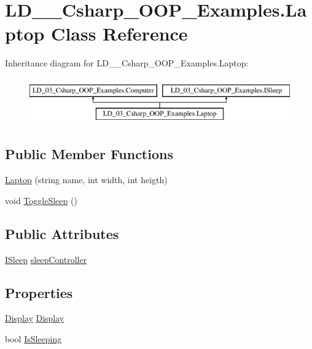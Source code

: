 \hypertarget{class_l_d__03___csharp___o_o_p___examples_1_1_laptop}{}\section{L\+D\+\_\+\_\+\+Csharp\+\_\+\+O\+O\+P\+\_\+\+Examples.\+Laptop Class Reference}
\label{class_l_d__03___csharp___o_o_p___examples_1_1_laptop}
Inheritance diagram for L\+D\+\_\+\_\+\+Csharp\+\_\+\+O\+O\+P\+\_\+\+Examples.\+Laptop\+:\begin{figure}[H]
\begin{center}
\leavevmode
\includegraphics[height=2.000000cm]{class_l_d__03___csharp___o_o_p___examples_1_1_laptop}
\end{center}
\end{figure}
\subsection*{Public Member Functions}
\begin{DoxyCompactItemize}
\item 
\mbox{\hyperlink{class_l_d__03___csharp___o_o_p___examples_1_1_laptop_a8221274b4d3b4d05eff718d010e0eefa}{Laptop}} (string name, int width, int heigth)
\item 
void \mbox{\hyperlink{class_l_d__03___csharp___o_o_p___examples_1_1_laptop_a28f09dd23331929b11cdc77720153e21}{Toggle\+Sleep}} ()
\end{DoxyCompactItemize}
\subsection*{Public Attributes}
\begin{DoxyCompactItemize}
\item 
\mbox{\hyperlink{interface_l_d__03___csharp___o_o_p___examples_1_1_i_sleep}{I\+Sleep}} \mbox{\hyperlink{class_l_d__03___csharp___o_o_p___examples_1_1_laptop_aabaead761ad3ae86e24f66e24d26fe31}{sleep\+Controller}}
\end{DoxyCompactItemize}
\subsection*{Properties}
\begin{DoxyCompactItemize}
\item 
\mbox{\hyperlink{class_l_d__03___csharp___o_o_p___examples_1_1_display}{Display}} \mbox{\hyperlink{class_l_d__03___csharp___o_o_p___examples_1_1_laptop_a38fa411e5013b052b67d7e2e4a32c816}{Display}}
\item 
bool \mbox{\hyperlink{class_l_d__03___csharp___o_o_p___examples_1_1_laptop_aaefe6924fee73daa583243aaea602a13}{Is\+Sleeping}}
\end{DoxyCompactItemize}
